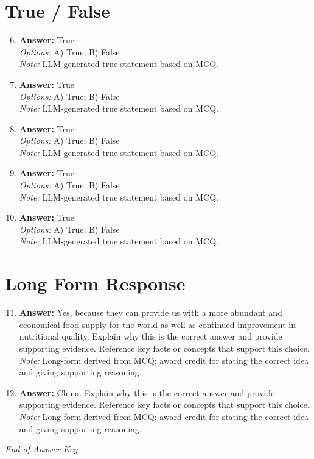 \documentclass[12pt]{article}
\begin{document}
\section*{True / False}
\begin{enumerate}[label=\arabic*.]
\setcounter{enumi}{5}
\item \textbf{Answer:} True
\\ \textit{Options:} A) True; B) False
\\ \textit{Note:} LLM-generated true statement based on MCQ.
\item \textbf{Answer:} True
\\ \textit{Options:} A) True; B) False
\\ \textit{Note:} LLM-generated true statement based on MCQ.
\item \textbf{Answer:} True
\\ \textit{Options:} A) True; B) False
\\ \textit{Note:} LLM-generated true statement based on MCQ.
\item \textbf{Answer:} True
\\ \textit{Options:} A) True; B) False
\\ \textit{Note:} LLM-generated true statement based on MCQ.
\item \textbf{Answer:} True
\\ \textit{Options:} A) True; B) False
\\ \textit{Note:} LLM-generated true statement based on MCQ.
\end{enumerate}

\section*{Long Form Response}
\begin{enumerate}[label=\arabic*.]
\setcounter{enumi}{10}
\item \textbf{Answer:} Yes, because they can provide us with a more abundant and economical food supply for the world as well as continued improvement in nutritional quality. Explain why this is the correct answer and provide supporting evidence. Reference key facts or concepts that support this choice.
\\ \textit{Note:} Long-form derived from MCQ; award credit for stating the correct idea and giving supporting reasoning.
\item \textbf{Answer:} China. Explain why this is the correct answer and provide supporting evidence. Reference key facts or concepts that support this choice.
\\ \textit{Note:} Long-form derived from MCQ; award credit for stating the correct idea and giving supporting reasoning.
\end{enumerate}

\vfill
\noindent\textit{End of Answer Key}
\end{document}
